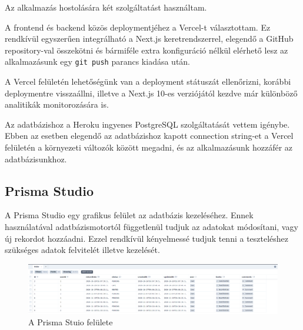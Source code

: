 Az alkalmazás hostolására két szolgáltatást használtam.

A frontend és backend közös deploymentjéhez a Vercel-t választottam. Ez rendkívül egyszerűen integrálható a Next.js keretrendszerrel,
elegendő a GitHub repository-val összekötni és bármiféle extra konfiguráció nélkül elérhető lesz az alkalmazásunk egy \lstinline|git push| parancs kiadása után.

A Vercel felületén lehetőségünk van a deployment státuszát ellenőrizni, korábbi deploymentre visszaállni, illetve a Next.js 10-es verziójától kezdve
már különböző analitikák monitorozására is.

Az adatbázishoz a Heroku ingyenes PostgreSQL szolgáltatását vettem igénybe. Ebben az esetben elegendő az adatbázishoz kapott
connection string-et a Vercel felületén a környezeti változók között megadni, és az alkalmazásunk hozzáfér az adatbázisunkhoz.

\subsection{Prisma Studio}

A Prisma Studio egy grafikus felület az adatbázis kezeléséhez. Ennek használatával adatbázismotortól függetlenül tudjuk
az adatokat módosítani, vagy új rekordot hozzáadni. Ezzel rendkívül kényelmessé tudjuk tenni a teszteléshez szükséges
adatok felvitelét illetve kezelését.

\begin{figure}[!ht]
\centering
\includegraphics[width=150mm, keepaspectratio]{figures/prisma-studio.png}
\caption{A Prisma Stuio felülete}
\label{fig:DBSchema}
\end{figure}
